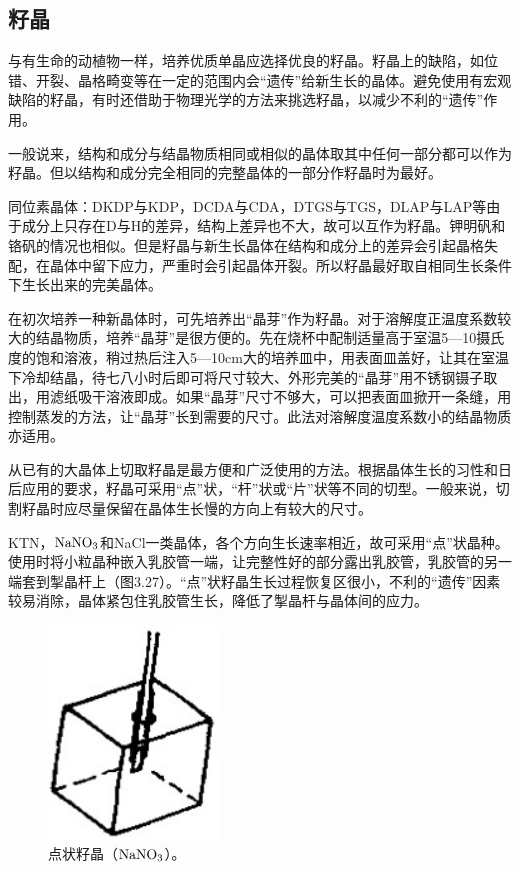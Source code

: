 ﻿\subsection{籽晶}
与有生命的动植物一样，培养优质单晶应选择优良的籽晶。籽晶上的缺陷，如位错、开裂、晶格畸变等在一定的范围内会“遗传”给新生长的晶体。避免使用有宏观缺陷的籽晶，有时还借助于物理光学的方法来挑选籽晶，以减少不利的“遗传”作用。

一般说来，结构和成分与结晶物质相同或相似的晶体取其中任何一部分都可以作为籽晶。但以结构和成分完全相同的完整晶体的一部分作籽晶时为最好。

同位素晶体：DKDP与KDP，DCDA与CDA，DTGS与TGS，DLAP与LAP等由于成分上只存在D与H的差异，结构上差异也不大，故可以互作为籽晶。钾明矾和铬矾的情况也相似。但是籽晶与新生长晶体在结构和成分上的差异会引起晶格失配，在晶体中留下应力，严重时会引起晶体开裂。所以籽晶最好取自相同生长条件下生长出来的完美晶体。

在初次培养一种新晶体时，可先培养出“晶芽”作为籽晶。对于溶解度正温度系数较大的结晶物质，培养“晶芽”是很方便的。先在烧杯中配制适量高于室温5---10摄氏度的饱和溶液，稍过热后注入5---10cm大的培养皿中，用表面皿盖好，让其在室温下冷却结晶，待七八小时后即可将尺寸较大、外形完美的“晶芽”用不锈钢镊子取出，用滤纸吸干溶液即成。如果“晶芽”尺寸不够大，可以把表面皿掀开一条缝，用控制蒸发的方法，让“晶芽”长到需要的尺寸。此法对溶解度温度系数小的结晶物质亦适用。

从已有的大晶体上切取籽晶是最方便和广泛使用的方法。根据晶体生长的习性和日后应用的要求，籽晶可采用“点”状，“杆”状或“片”状等不同的切型。一般来说，切割籽晶时应尽量保留在晶体生长慢的方向上有较大的尺寸。

KTN，$\rm NaNO_3$和NaCl一类晶体，各个方向生长速率相近，故可采用“点”状晶种。使用时将小粒晶种嵌入乳胶管一端，让完整性好的部分露出乳胶管，乳胶管的另一端套到掣晶杆上（图3.27）。“点”状籽晶生长过程恢复区很小，不利的“遗传”因素较易消除，晶体紧包住乳胶管生长，降低了掣晶杆与晶体间的应力。

\begin{figure}[htbp]
 \centering
 \includegraphics[width=0.4\textwidth]{fig/cp03/img3.27.jpg}
 \caption{点状籽晶（$\rm NaNO_3$）。}
\end{figure}

